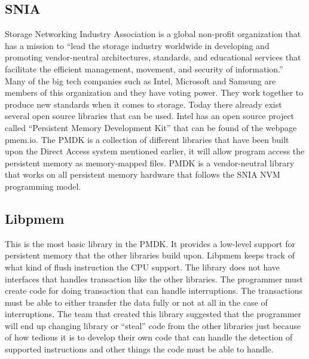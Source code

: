 \documentclass[12pt,a4paper,UKenglish]{article}
\begin{document}
\subsection{SNIA}
Storage Networking Industry Association is a global non-profit organization that has a mission to “lead the storage industry worldwide in developing and promoting vendor-neutral architectures, standards, and educational services that facilitate the efficient management, movement, and security of information.” Many of the big tech companies such as Intel, Microsoft and Samsung are members of this organization and they have voting power. They work together to produce new standards when it comes to storage. 
\newline\newline
Today there already exist several open source libraries that can be used. Intel has an open source project called “Persistent Memory Development Kit” that can be found of the webpage pmem.io. The PMDK is a collection of different libraries that have been built upon the Direct Access system mentioned earlier, it will allow program access the persistent memory as memory-mapped files. PMDK is a vendor-neutral library that works on all persistent memory hardware that follows the SNIA NVM programming model. 

\subsection{Libpmem}
This is the most basic library in the PMDK. It provides a low-level support for persistent memory that the other libraries build upon. Libpmem\cite{libpmem} keeps track of what kind of flush instruction the CPU support. The library does not have interfaces that handles transaction like the other libraries. The programmer must create code for doing transaction that can handle interruptions. The transactions must be able to either transfer the data fully or not at all in the case of interruptions. The team that created this library suggested that the programmer will end up changing library or “steal” code from the other libraries just because of how tedious it is to develop their own code that can handle the detection of supported instructions and other things the code must be able to handle.
\end{document}
